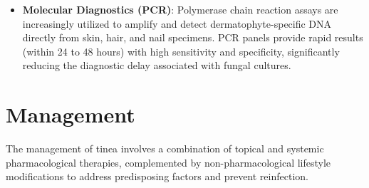 \begin{itemize}
    \item \textbf{Molecular Diagnostics (PCR)}: Polymerase chain reaction assays are increasingly utilized to amplify and detect dermatophyte-specific DNA directly from skin, hair, and nail specimens. PCR panels provide rapid results (within 24 to 48 hours) with high sensitivity and specificity, significantly reducing the diagnostic delay associated with fungal cultures.
\end{itemize}

\section*{Management}
The management of tinea involves a combination of topical and systemic pharmacological therapies, complemented by non-pharmacological lifestyle modifications to address predisposing factors and prevent reinfection.

